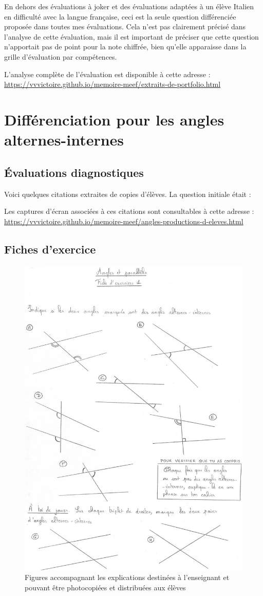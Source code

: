 En dehors des évaluations à joker et des évaluations adaptées à un élève Italien en difficulté avec la langue française, ceci est la seule question différenciée proposée dans toutes mes évaluations. Cela n'est pas clairement précisé dans l'analyse de cette évaluation, mais il est important de préciser que cette question n'apportait pas de point pour la note chiffrée, bien qu'elle apparaisse dans la grille d'évaluation par compétences.

L'analyse complète de l'évaluation est disponible à cette adresse : \url{https://vvvictoire.github.io/memoire-meef/extraits-de-portfolio.html}

\clearpage

\section{Différenciation pour les angles alternes-internes}

\subsection{Évaluations diagnostiques}\label{annexe:angles-prod1}

Voici quelques citations extraites de copies d'élèves. La question initiale était :

Les captures d'écran associées à ces citations sont consultables à cette adresse : \url{https://vvvictoire.github.io/memoire-meef/angles-productions-d-eleves.html}

\subsection{Fiches d'exercice}\label{annexe:angles-fiches}

\begin{figure}[h!]
    \centering
    \includegraphics[width=0.6\linewidth]{img/anglesfiche1.jpg}
    \caption{Figures accompagnant les explications destinées à l'enseignant et pouvant être photocopiées et distribuées aux élèves}
    \label{fig:angles-fiche1}
\end{figure}

